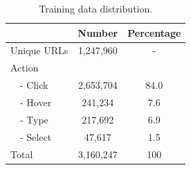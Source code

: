 \begin{table}[tbh]
\centering
\small
\begin{tabular}{lcc}
\toprule
            & \multicolumn{1}{c}{Number} & \multicolumn{1}{c}{Percentage} \\ \midrule
Unique URLs & 1,247,960                    & \multicolumn{1}{c}{-}         \\ \midrule
Action      & \multicolumn{1}{c}{}       & \multicolumn{1}{c}{}          \\
~~- Click       & 2,653,704                    & 84.0                          \\
~~- Hover       & 241,234                     & 7.6                           \\
~~- Type        & 217,692                     & 6.9                           \\
~~- Select      & 47,617                      & 1.5                           \\
Total       & 3,160,247                    & 100                          \\ \bottomrule
\end{tabular}
\caption{Training data distribution.}
\label{tab:appendix-training-data-dist}
\end{table}


